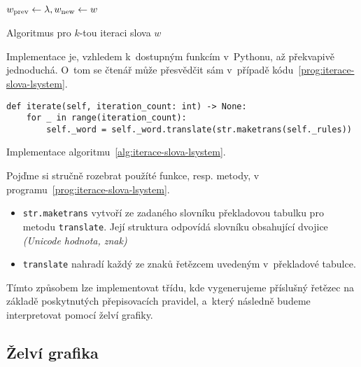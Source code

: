 \begin{algorithm}[h]
    $w_{\textup{prev}}\gets\lambda,w_{\textup{new}}\gets w$\;
    \;
    \caption{Algoritmus pro $k$-tou iteraci slova $w$}
    \label{alg:iterace-slova-lsystem}
\end{algorithm}
Implementace je, vzhledem k~dostupným funkcím v~Pythonu, až překvapivě jednoduchá. O~tom se čtenář může přesvědčit sám v~případě kódu~\ref{prog:iterace-slova-lsystem}.
\begin{program}[h]
\begin{lstlisting}[style=python]
def iterate(self, iteration_count: int) -> None:
    for _ in range(iteration_count):
        self._word = self._word.translate(str.maketrans(self._rules))
\end{lstlisting}
    \caption{Implementace algoritmu~\ref{alg:iterace-slova-lsystem}.}
    \label{prog:iterace-slova-lsystem}
\end{program}
Pojďme si stručně rozebrat použíté funkce, resp. metody, v programu~\ref{prog:iterace-slova-lsystem}.
\begin{itemize}
    \item \texttt{str.maketrans} vytvoří ze zadaného slovníku překladovou tabulku pro metodu \texttt{translate}. Její struktura odpovídá slovníku obsahující dvojice \emph{(Unicode hodnota, znak)}
    \item \texttt{translate} nahradí každý ze znaků řetězcem uvedeným v~překladové tabulce.
\end{itemize}
Tímto způsobem lze implementovat třídu, kde vygenerujeme příslušný řetězec na základě poskytnutých přepisovacích pravidel, a~který následně budeme interpretovat pomocí želví grafiky.

\subsection{Želví grafika}\label{subsec:implementace-zelvi-grafiky}

